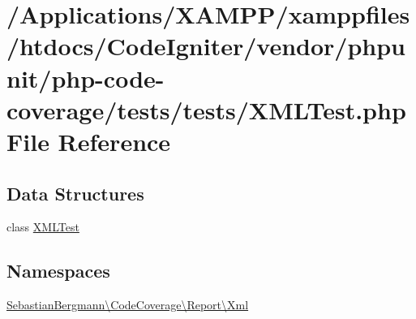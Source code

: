\hypertarget{php-code-coverage_2tests_2tests_2_x_m_l_test_8php}{}\section{/\+Applications/\+X\+A\+M\+P\+P/xamppfiles/htdocs/\+Code\+Igniter/vendor/phpunit/php-\/code-\/coverage/tests/tests/\+X\+M\+L\+Test.php File Reference}
\label{php-code-coverage_2tests_2tests_2_x_m_l_test_8php}
\subsection*{Data Structures}
\begin{DoxyCompactItemize}
\item 
class \mbox{\hyperlink{class_sebastian_bergmann_1_1_code_coverage_1_1_report_1_1_xml_1_1_x_m_l_test}{X\+M\+L\+Test}}
\end{DoxyCompactItemize}
\subsection*{Namespaces}
\begin{DoxyCompactItemize}
\item 
 \mbox{\hyperlink{namespace_sebastian_bergmann_1_1_code_coverage_1_1_report_1_1_xml}{Sebastian\+Bergmann\textbackslash{}\+Code\+Coverage\textbackslash{}\+Report\textbackslash{}\+Xml}}
\end{DoxyCompactItemize}
